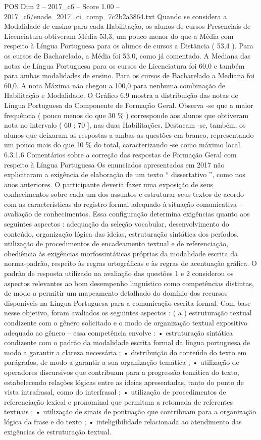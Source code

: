 \begin{textsample}{POS Dim 2 – 2017\_c6 – Score 1.00 – 2017\_c6/enade\_2017\_ci\_comp\_7c2b2a3864.txt}
Quando se considera a Modalidade de ensino para cada Habilitação, os alunos de cursos Presenciais de Licenciatura obtiveram Média 53,3, um pouco menor do que a Média com respeito à Língua Portuguesa para os alunos de cursos a Distância ( 53,4 ).
Para os cursos de Bacharelado, a Média foi 53,0, como já comentado.
A Mediana das notas de Língua Portuguesa para os cursos de Licenciatura foi 60,0 e também para ambas modalidades de ensino.
Para os cursos de Bacharelado a Mediana foi 60,0.
A nota Máxima não chegou a 100,0 para nenhuma combinação de Habilitação e Modalidade.
O Gráfico 6.9 mostra a distribuição das notas de Língua Portuguesa do Componente de Formação Geral.
Observa -se que a maior frequência ( pouco menos do que 30 \% ) corresponde aos alunos que obtiveram nota no intervalo ( 60 ; 70 ], nas duas Habilitações.
Destacam -se, também, os alunos que deixaram as respostas a ambas as questões em branco, representando um pouco mais do que 10 \% do total, caracterizando -se como máximo local. 6.3.1.6 Comentários sobre a correção das respostas de Formação Geral com respeito à Língua Portuguesa Os enunciados apresentados em 2017 não explicitaram a exigência de elaboração de um texto “ dissertativo ”, como nos anos anteriores.
O participante deveria fazer uma exposição de seus conhecimentos sobre cada um dos assuntos e estruturar seus textos de acordo com as características do registro formal adequado à situação comunicativa – avaliação de conhecimentos.
Essa configuração determina exigências quanto aos seguintes aspectos : adequação da seleção vocabular, desenvolvimento do conteúdo, organização lógica das ideias, estruturação sintática dos períodos, utilização de procedimentos de encadeamento textual e de referenciação, obediência às exigências morfossintáticas próprias da modalidade escrita da norma-padrão, respeito às regras ortográficas e às regras de acentuação gráfica.
O padrão de resposta utilizado na avaliação das questões 1 e 2 considerou os aspectos relevantes ao bom desempenho linguístico como competências distintas, de modo a permitir um mapeamento detalhado do domínio dos recursos disponíveis na Língua Portuguesa para a comunicação escrita formal.
Com base nesse objetivo, foram avaliados os seguintes aspectos : ( a ) estruturação textual condizente com o gênero solicitado e o modo de organização textual expositivo adequado ao gênero – essa competência envolve : • estruturação sintática condizente com o padrão da modalidade escrita formal da língua portuguesa de modo a garantir a clareza necessária ; • distribuição do conteúdo do texto em parágrafos, de modo a garantir a sua organização temática ; • utilização de operadores discursivos que contribuam para a progressão temática do texto, estabelecendo relações lógicas entre as ideias apresentadas, tanto do ponto de vista intrafrasal, como do interfrasal ; • utilização de procedimentos de referenciação lexical e pronominal que permitam a retomada de referentes textuais ; • utilização de sinais de pontuação que contribuam para a organização lógica da frase e do texto ; • inteligibilidade relacionada ao atendimento das exigências de estruturação textual.

\end{textsample}
